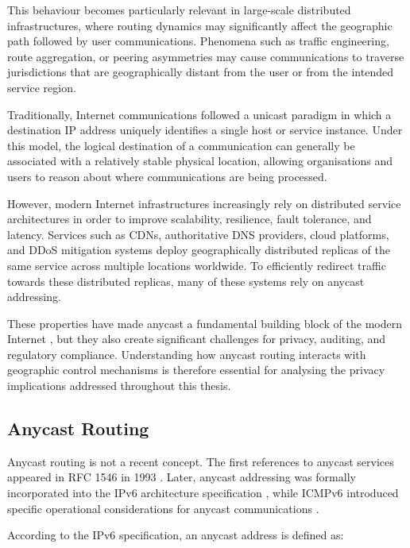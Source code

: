 This behaviour becomes particularly relevant in large-scale distributed infrastructures, where routing dynamics may significantly affect the geographic path followed by user communications. Phenomena such as traffic engineering, route aggregation, or peering asymmetries may cause communications to traverse jurisdictions that are geographically distant from the user or from the intended service region.

Traditionally, Internet communications followed a unicast paradigm in which a destination IP address uniquely identifies a single host or service instance. Under this model, the logical destination of a communication can generally be associated with a relatively stable physical location, allowing organisations and users to reason about where communications are being processed.

However, modern Internet infrastructures increasingly rely on distributed service architectures in order to improve scalability, resilience, fault tolerance, and latency. Services such as CDNs, authoritative DNS providers, cloud platforms, and DDoS mitigation systems deploy geographically distributed replicas of the same service across multiple locations worldwide. To efficiently redirect traffic towards these distributed replicas, many of these systems rely on anycast addressing.

These properties have made anycast a fundamental building block of the modern Internet \cite{Abley2006OperationServices,McPherson2014ArchitecturalAnycast}, but they also create significant challenges for privacy, auditing, and regulatory compliance. Understanding how anycast routing interacts with geographic control mechanisms is therefore essential for analysing the privacy implications addressed throughout this thesis.

\subsection{Anycast Routing}
\label{sc:background_internet_routing_anycast}

Anycast routing is not a recent concept. The first references to anycast services appeared in RFC 1546 in 1993 \cite{Partridge1993HostService}. Later, anycast addressing was formally incorporated into the IPv6 architecture specification \cite{Hinden2003InternetArchitecture}, while ICMPv6 introduced specific operational considerations for anycast communications \cite{Conta2006InternetSpecification}.

According to the IPv6 specification, an anycast address is defined as:

